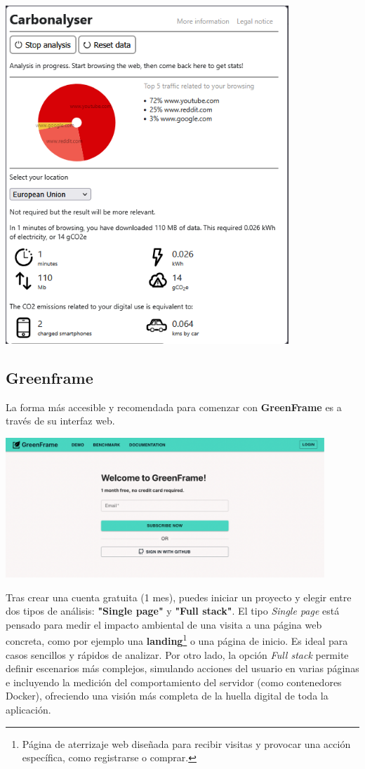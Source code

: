 \documentclass[12pt,a4paper]{report}
\begin{document}
\begin{center}
  \includegraphics[width=0.8\textwidth]{imagenes/Carbonalyser_3.png}
\end{center}

\subsection{Greenframe}
La forma más accesible y recomendada para comenzar con \textbf{GreenFrame} es a
través de su interfaz web.

\begin{center}
  \includegraphics[width=0.9\textwidth]{imagenes/Greenframe_1.png}
\end{center}

Tras crear una cuenta gratuita (1 mes), puedes iniciar un proyecto y elegir
entre dos tipos de análisis: \textbf{"Single page"} y \textbf{"Full stack"}. El
tipo \textit{Single page} está pensado para medir el impacto ambiental de una
visita a una página web concreta, como por ejemplo una
\textbf{landing}\footnote{Página de aterrizaje web diseñada para recibir
  visitas y provocar una acción específica, como registrarse o comprar.} o una
página de inicio. Es ideal para casos sencillos y rápidos de analizar. Por otro
lado, la opción \textit{Full stack} permite definir escenarios más complejos,
simulando acciones del usuario en varias páginas e incluyendo la medición del
comportamiento del servidor (como contenedores Docker), ofreciendo una visión
más completa de la huella digital de toda la aplicación.
\end{document}
